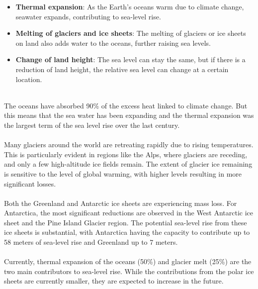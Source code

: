 \documentclass[../summary.tex]{subfiles}
\begin{document}
\begin{itemize}
	\item \textbf{Thermal expansion}: As the Earth's oceans warm due to climate change, seawater expands, contributing to sea-level rise.
	\item \textbf{Melting of glaciers and ice sheets}: The melting of glaciers or ice sheets on land also adds water to the oceans, further raising sea levels.
	\item \textbf{Change of land height}: The sea level can stay the same, but if there is a reduction of land height, the relative sea level can change at a certain location.

\end{itemize}
\ \\
The oceans have absorbed 90\% of the excess heat linked to climate change. But this means that the sea water has been expanding and the thermal expansion was the largest term of the sea level rise over the last century.\\
\\
Many glaciers around the world are retreating rapidly due to rising temperatures. This is particularly evident in regions like the Alps, where glaciers are receding, and only a few high-altitude ice fields remain. The extent of glacier ice remaining is sensitive to the level of global warming, with higher levels resulting in more significant losses.\\
\\
Both the Greenland and Antarctic ice sheets are experiencing mass loss. For Antarctica, the most significant reductions are observed in the West Antarctic ice sheet and the Pine Island Glacier region. The potential sea-level rise from these ice sheets is substantial, with Antarctica having the capacity to contribute up to 58 meters of sea-level rise and Greenland up to 7 meters.\\
\\
Currently, thermal expansion of the oceans (50\%) and glacier melt (25\%) are the two main contributors to sea-level rise. While the contributions from the polar ice sheets are currently smaller, they are expected to increase in the future.
\end{document}

